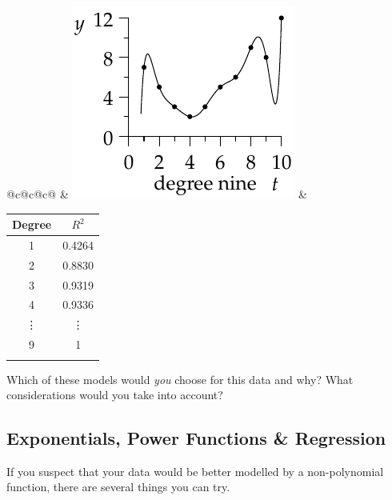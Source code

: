 \begin{exercises}{}{}
\begin{enumerate}
\begin{enumerate}
\begin{center}
\begin{tabular}[t]{@{}c@{\quad}c@{\quad}c@{}}
    		&
    		\includegraphics{midterm-reg9}
    		&
    		\begin{tabular}[b]{c|c}
    		Degree&$R^2$\\\hline
    		1&0.4264\\
    		2&0.8830\\
    		3&0.9319\\
    		4&0.9336\\
    		\vdots&\vdots\\
    		9&1\\
    		\multicolumn{2}{c}{}
    		\end{tabular}
    	\end{tabular}
    \end{center}

    Which of these models would \emph{you} choose for this data and why? What considerations would you take into account?  
	\end{enumerate}
\end{enumerate}
\end{exercises}

\clearpage


\subsection{Exponentials, Power Functions \& Regression}

If you suspect that your data would be better modelled by a non-polynomial function, there are several things you can try.\medbreak

